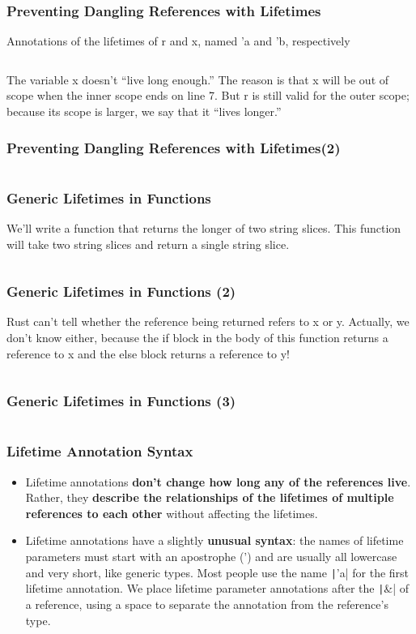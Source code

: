 \documentclass{beamer}
\begin{document}
\begin{frame}[fragile]
	\frametitle{Preventing Dangling References with Lifetimes}
	Annotations of the lifetimes of r and x, named 'a and 'b, respectively
	
	\inputminted{rust}{./code/dangling-ref.rs}
	
	The variable x doesn’t “live long enough.” The reason is that x will be out of scope when the inner scope ends on line 7. But r is still valid for the outer scope; because its scope is larger, we say that it “lives longer.” 
\end{frame}

\begin{frame}[fragile]
	\frametitle{Preventing Dangling References with Lifetimes(2)}
	\inputminted{shell}{./code/dangling-ref.shell}
\end{frame}


\begin{frame}[fragile]
	\frametitle{Generic Lifetimes in Functions}
	We’ll write a function that returns the longer of two string slices. This function will take two string slices and return a single string slice.
	
	\inputminted{rust}{./code/lifetime.rs}
\end{frame}



\begin{frame}[fragile]
	\frametitle{Generic Lifetimes in Functions (2)}
	Rust can’t tell whether the reference being returned refers to x or y. Actually, we don’t know either, because the if block in the body of this function returns a reference to x and the else block returns a reference to y!
	
	\inputminted{rust}{./code/lifetime2.rs}
\end{frame}


\begin{frame}[fragile]
	\frametitle{Generic Lifetimes in Functions (3)}
	\inputminted{shell}{./code/lifetime2.shell}
\end{frame}

\begin{frame}[fragile]
	\frametitle{Lifetime Annotation Syntax}
\begin{itemize}
	\item 	Lifetime annotations \textbf{don’t change how long any of the references live}. Rather, they \textbf{describe the relationships of the lifetimes of multiple references to each other }without affecting the lifetimes.
	\item 	Lifetime annotations have a slightly \textbf{unusual syntax}: the names of lifetime parameters must start with an apostrophe (') and are usually all lowercase and very short, like generic types. Most people use the name \texttt|'a| for the first lifetime annotation. We place lifetime parameter annotations after the \texttt|&| of a reference, using a space to separate the annotation from the reference’s type.
	
	\inputminted{rust}{./code/lifetime3.rs}
\end{itemize}
\end{frame}
\end{document}
